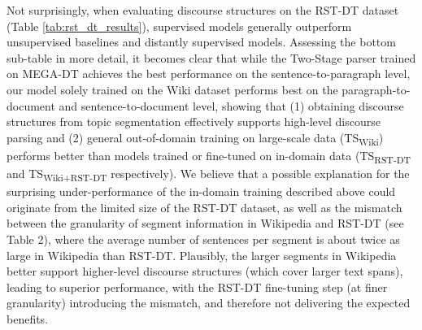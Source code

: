 \documentclass[letterpaper]{article} %
\begin{document}
Not surprisingly, when evaluating discourse structures on the RST-DT dataset (Table \ref{tab:rst_dt_results}), supervised models generally outperform unsupervised baselines and distantly supervised models. Assessing the bottom sub-table in more detail, it becomes clear that while the Two-Stage parser trained on MEGA-DT achieves the best performance on the sentence-to-paragraph level, our model solely trained on the Wiki dataset performs best on the paragraph-to-document and sentence-to-document level, showing that (1) obtaining discourse structures from topic segmentation effectively supports high-level discourse parsing and (2) general out-of-domain training on large-scale data (TS\textsubscript{Wiki}) performs better than models trained or fine-tuned on in-domain data (TS\textsubscript{RST-DT} and TS\textsubscript{Wiki+RST-DT} respectively). We believe that a possible explanation for the surprising under-performance of the in-domain training described above could originate from the limited size of the RST-DT dataset, as well as the mismatch between the granularity of segment information in Wikipedia and RST-DT (see Table 2), where the average number of sentences per segment is about twice as large in Wikipedia than RST-DT. Plausibly, the larger segments in Wikipedia better support higher-level discourse structures (which cover larger text spans), leading to superior performance, with the RST-DT fine-tuning step (at finer granularity) introducing the mismatch, and therefore not delivering the expected benefits.
\end{document}
